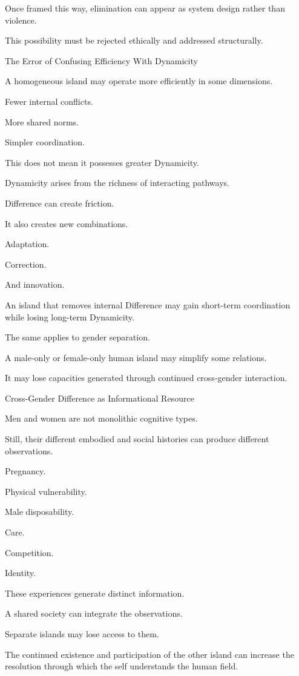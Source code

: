 Once framed this way, elimination can appear as system design rather than violence.

This possibility must be rejected ethically and addressed structurally.

The Error of Confusing Efficiency With Dynamicity

A homogeneous island may operate more efficiently in some dimensions.

Fewer internal conflicts.

More shared norms.

Simpler coordination.

This does not mean it possesses greater Dynamicity.

Dynamicity arises from the richness of interacting pathways.

Difference can create friction.

It also creates new combinations.

Adaptation.

Correction.

And innovation.

An island that removes internal Difference may gain short-term coordination while losing long-term Dynamicity.

The same applies to gender separation.

A male-only or female-only human island may simplify some relations.

It may lose capacities generated through continued cross-gender interaction.

Cross-Gender Difference as Informational Resource

Men and women are not monolithic cognitive types.

Still, their different embodied and social histories can produce different observations.

Pregnancy.

Physical vulnerability.

Male disposability.

Care.

Competition.

Identity.

These experiences generate distinct information.

A shared society can integrate the observations.

Separate islands may lose access to them.

The continued existence and participation of the other island can increase the resolution through which the self understands the human field.

